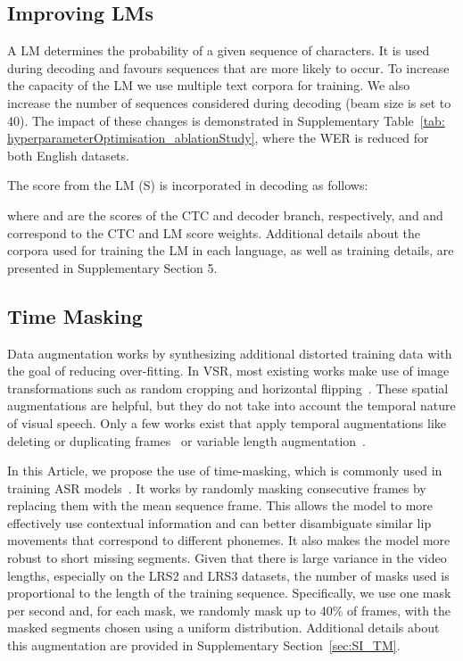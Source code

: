 \documentclass[twocolumn]{article}
\begin{document}
\subsection{Improving LMs}
A LM determines the probability of a given sequence of characters. It is used during decoding and favours sequences that are more likely to occur. To increase the capacity of the LM we use multiple text corpora for training. We also increase the number of sequences considered during decoding (beam size is set to 40). The impact of these changes is demonstrated in Supplementary Table~\ref{tab: hyperparameterOptimisation_ablationStudy}, where the WER is reduced for both English datasets.

The score from the LM (S) is incorporated in decoding as follows:

where  and  are the scores of the CTC and decoder branch, respectively, and  and  correspond to the CTC and LM score weights. Additional details about the corpora used for training the LM in each language, as well as training details, are presented in Supplementary Section 5.

\subsection{Time Masking}
Data augmentation works by synthesizing additional distorted training data with the goal of reducing over-fitting. In VSR, most existing works make use of image transformations such as random cropping and horizontal flipping~\cite{DBLP:journals/corr/SimonyanZ14a, DBLP:journals/corr/abs-2102-06657, petridis2018audio}. These spatial augmentations are helpful, but they do not take into account the temporal nature of visual speech. Only a few works exist that apply temporal augmentations like deleting or duplicating frames~\cite{assael2016lipnet} or variable length augmentation~\cite{ma2020towards}.

In this Article, we propose the use of time-masking, which is commonly used in training ASR models~\cite{park2019specaugment}. It works by randomly masking  consecutive frames by replacing them with the mean sequence frame. This allows the model to more effectively use contextual information and can better disambiguate similar lip movements that correspond to different phonemes. It also makes the model more robust to short missing segments. Given that there is large variance in the video lengths, especially on the LRS2 and LRS3 datasets, the number of masks used is proportional to the length of the training sequence. Specifically, we use one mask per second and, for each mask, we randomly mask up to 40\% of frames, with the masked segments chosen using a uniform distribution. Additional details about this augmentation are provided in Supplementary Section~\ref{sec:SI_TM}.
\end{document}
